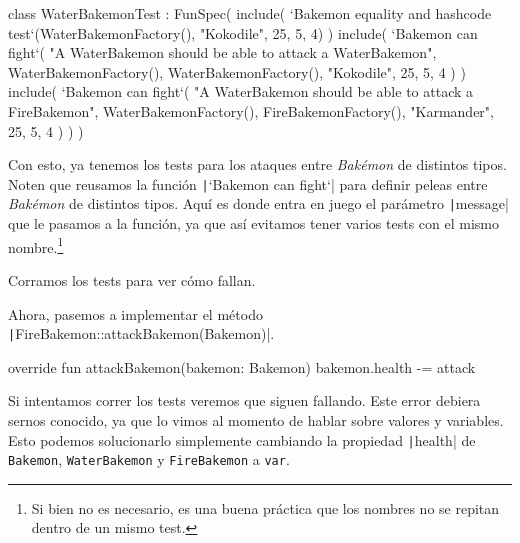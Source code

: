   \begin{kotlin}
    class WaterBakemonTest : FunSpec({
      include(
        `Bakemon equality and hashcode test`(WaterBakemonFactory(), "Kokodile", 25, 5, 4)
      )
      include(
        `Bakemon can fight`(
          "A WaterBakemon should be able to attack a WaterBakemon",
          WaterBakemonFactory(), WaterBakemonFactory(), "Kokodile", 25, 5, 4
        )
      )
      include(
        `Bakemon can fight`(
          "A WaterBakemon should be able to attack a FireBakemon",
          WaterBakemonFactory(), FireBakemonFactory(), "Karmander", 25, 5, 4
        )
      )
    })
  \end{kotlin}

  Con esto, ya tenemos los tests para los ataques entre \textit{Bakémon} de distintos tipos.
  Noten que reusamos la función \texttt|`Bakemon can fight`| para definir peleas entre
  \textit{Bakémon} de distintos tipos.
  Aquí es donde entra en juego el parámetro \texttt|message| que le pasamos a la 
  función, ya que así evitamos tener varios tests con el mismo nombre.\footnote{Si bien no es
  necesario, es una buena práctica que los nombres no se repitan dentro de un mismo test.}

  Corramos los tests para ver cómo fallan.

  Ahora, pasemos a implementar el método \texttt|FireBakemon::attackBakemon(Bakemon)|.

  \begin{kotlin}
    override fun attackBakemon(bakemon: Bakemon) {
      bakemon.health -= attack
    }
  \end{kotlin}

  Si intentamos correr los tests veremos que siguen fallando.
  Este error debiera sernos conocido, ya que lo vimos al momento de hablar sobre valores y 
  variables.
  Esto podemos solucionarlo simplemente cambiando la propiedad \texttt|health| de
  \texttt{Bakemon}, \texttt{WaterBakemon} y \texttt{FireBakemon}
  a \texttt{var}.